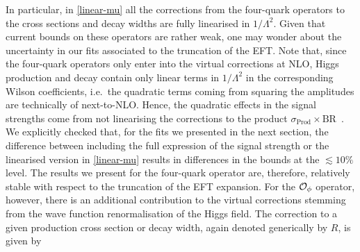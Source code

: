 In particular, in \eqref{linear-mu} all the corrections from the four-quark operators to the cross sections and decay widths are fully linearised in $1/\Lambda^2$. 
Given that current bounds on these operators are rather weak, one may wonder about the uncertainty in our fits associated to the truncation of the EFT.
Note that, since the four-quark operators only enter into the virtual corrections at NLO, Higgs production and decay contain only linear terms in $1/\Lambda^{2}$ in the corresponding Wilson coefficients, i.e.~the quadratic terms coming from squaring the amplitudes are technically of next-to-NLO. 
Hence, the quadratic effects in the signal strengths come from not linearising the corrections to the product $\sigma_\mathrm{ Prod} \times \mathrm{ BR}$~\!.  
We explicitly checked that, for the fits we presented in the next section, the difference between including the full expression of the signal strength or the linearised version in \eqref{linear-mu} results in differences in the bounds at the $\lesssim10\%$ level. The results we present for the four-quark operator are, therefore, relatively stable with respect to the truncation of the EFT expansion. 
For the ${\cal O}_{\phi}$ operator, however, there is an additional contribution to the virtual corrections stemming from the wave function renormalisation of the Higgs field. The correction to a given production cross section or decay width, again denoted generically by $R$, is given by

